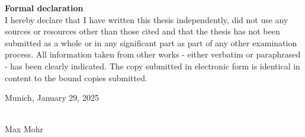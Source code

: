 \documentclass[12pt, a4paper, titlepage]{article}
\begin{document}
\newpage
{\Large\textbf{Formal declaration}}\\

I hereby declare that I have written this thesis independently, did not use any sources or resources other than those cited and that the thesis has not been submitted as a whole or in any significant part as part of any other examination process. All information taken from other works - either verbatim or paraphrased - has been clearly indicated. The copy submitted in electronic form is identical in content to the bound copies submitted.

\vspace{1cm}

Munich, January 29, 2025

\vspace{1cm}
\makebox[5cm]{\hrulefill}\\
Max Mohr
\end{document}
